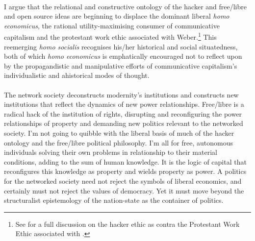 \paragraph{}I argue that the relational and constructive ontology of the hacker and free/libre and open source ideas are beginning to displace the dominant liberal \textit{homo economicus}, the rational utility-maximising consumer of communicative capitalism and the protestant work ethic associated with Weber.\footnote{See \cite[Ch. 1 \& 2]{himanen:2001he} for a full discussion on the hacker ethic as contra the Protestant Work Ethic associated with \cite{weber:1958}.} This reemerging \textit{homo socialis} recognises his/her historical and social situatedness, both of  which \textit{homo economicus} is emphatically encouraged not to reflect upon by the propagandistic and manipulative efforts of communicative capitalism's individualistic and ahistorical modes of thought.

\paragraph{}The network society deconstructs modernity's institutions and constructs new institutions that reflect the dynamics of new power relationships. Free/libre is a radical hack of the institution of rights, disrupting and reconfiguring the power relationships of property and demanding new politics relevant to the networked society. I'm not going to quibble with the liberal basis of much of the hacker ontology and the free/libre political philosophy. I'm all for free, autonomous individuals solving their own problems in relationship to their material conditions, adding to the sum of human knowledge. It is the logic of capital that reconfigures this knowledge as property and wields property as power. A politics for the networked society need not reject the symbols of liberal economics, and certainly must not reject the values of democracy. Yet it must move beyond the structuralist epistemology of the nation-state as the container of politics.

